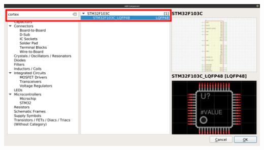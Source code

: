 \begin{frame}[noframenumbering]{\secname}
  \begin{center}
    \includegraphics[width=.95\textwidth]{images/library_browser_keywords.png}
  \end{center}
\end{frame}
